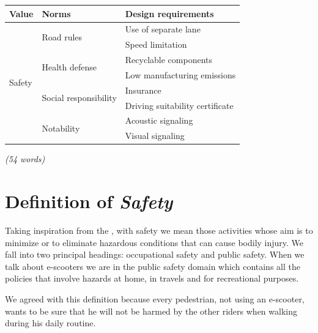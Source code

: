 \begin{table}[h]
\centering
\begin{tabular}{|l|l|l|}
\hline
\multicolumn{1}{|c|}{\textbf{Value}} & \textbf{Norms}                           & \textbf{Design requirements}        \\ \hline
\multirow{8}{*}{Safety}              & \multirow{2}{*}{Road rules}              & Use of separate lane                \\ \cline{3-3} 
                                     &                                          & Speed limitation                    \\ \cline{2-3} 
                                     & \multirow{2}{*}{Health defense}          & Recyclable components               \\ \cline{3-3} 
                                     &                                          & Low manufacturing emissions         \\ \cline{2-3} 
                                     & \multirow{2}{*}{Social responsibility}   & Insurance                           \\ \cline{3-3} 
                                     &                                          & Driving suitability certificate     \\ \cline{2-3} 
                                     & \multirow{2}{*}{Notability}              & Acoustic signaling                  \\ \cline{3-3} 
                                     &                                          & Visual signaling                    \\ \hline
\end{tabular}
\end{table}

\emph{(54 words)}

\section{Definition of \textit{Safety}}
Taking inspiration from the \textit{\cite{EBSafe}}, with safety we mean those activities whose aim is to minimize or to eliminate hazardous conditions that can cause bodily injury. We fall into two principal headings: occupational safety and public safety. When we talk about e-scooters we are in the public safety domain which contains all the policies that involve hazards at home, in travels and for recreational purposes.

We agreed with this definition because every pedestrian, not using an e-scooter, wants to be sure that he will not be harmed by the other riders when walking during his daily routine.

